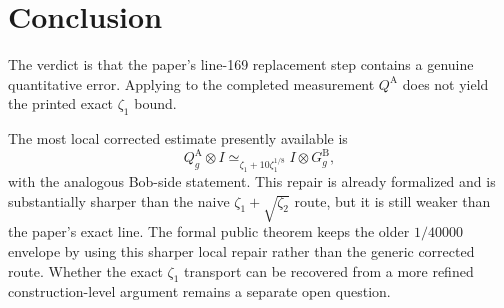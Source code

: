 \documentclass[11pt]{article}
\begin{document}
\section{Conclusion}

The verdict is that the paper's line-169 replacement step contains a genuine
quantitative error.  Applying  to the completed
measurement $Q^{\mathrm A}$ does not yield the printed exact $\zeta_1$ bound.

The most local corrected estimate presently available is
\[
  Q^{\mathrm A}_g \otimes I
  \simeq_{\zeta_1 + 10\zeta_1^{1/8}}
  I \otimes G^{\mathrm B}_g,
\]
with the analogous Bob-side statement.  This repair is already formalized and
is substantially sharper than the naive $\zeta_1 + \sqrt{\zeta_2}$ route, but
it is still weaker than the paper's exact line.  The formal public theorem keeps
the older $1/40000$ envelope by using this sharper local repair rather than the
generic corrected route.  Whether the exact $\zeta_1$ transport can be recovered
from a more refined construction-level argument remains a separate open question.



\end{document}
